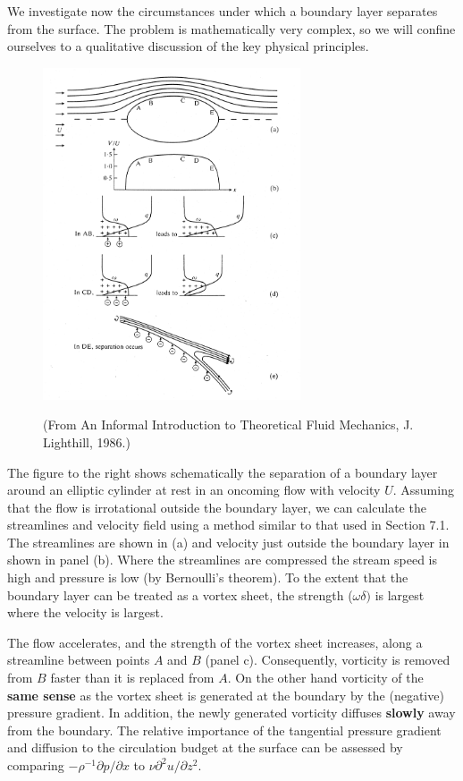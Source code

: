 \documentclass[twoside,a4paper,11pt]{report}
\begin{document}
We investigate now the circumstances under which a boundary layer separates 
from the surface. The problem is mathematically very complex, so we will 
confine ourselves to a qualitative discussion of the key physical 
principles.

\newpage

\begin{figure}
\centerline{\includegraphics[width=3in]{Section76.pdf}}
{\bigskip}
\begin{center}
{\small (From An Informal Introduction to Theoretical Fluid Mechanics, J. Lighthill, 1986.)}
\end{center}
\label{fig6}
\end{figure}

The figure to the right shows schematically the separation of a boundary layer around an 
elliptic cylinder at rest in an oncoming flow with velocity $U$. Assuming that 
the flow is irrotational outside the boundary layer, we can calculate the 
streamlines and velocity field using a method similar to that used in 
Section 7.1. The streamlines are shown in (a) and velocity just outside the 
boundary layer in shown in panel (b). Where the streamlines are compressed 
the stream speed is high and pressure is low (by Bernoulli's theorem). To 
the extent that the boundary layer can be treated as a vortex sheet, the 
strength ($\omega \delta )$ is largest where the velocity is largest. 

The flow accelerates, and the strength of the vortex sheet increases, along 
a streamline between points $A$ and $B$ (panel c). Consequently, vorticity is 
removed from $B$ faster than it is replaced from $A$. On the other hand 
vorticity of the \textbf{same sense} as the vortex sheet is generated at the 
boundary by the (negative) pressure gradient. In addition, the newly 
generated vorticity diffuses \textbf{slowly} away from the boundary. The 
relative importance of the tangential pressure gradient and diffusion to the 
circulation budget at the surface can be assessed by comparing $-\rho 
^{-1}{\partial p} / {\partial x}$ to $\nu {\partial ^2u} 
/ {\partial z^2}$. 
\end{document}
